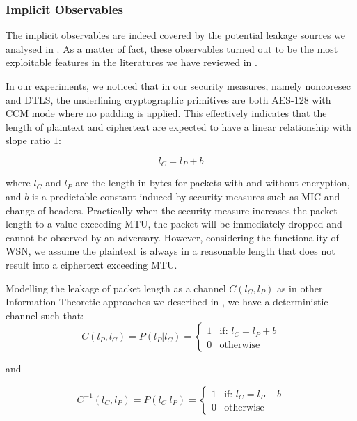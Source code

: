 \subsubsection{Implicit Observables}

The implicit observables are indeed covered by the potential leakage sources we analysed in . As a matter of fact, these observables turned out to be the most exploitable features in the literatures we have reviewed in .

In our experiments, we noticed that in our security measures, namely noncoresec and DTLS, the underlining cryptographic primitives are both AES-128 with CCM mode where no padding is applied. This effectively indicates that the length of plaintext and ciphertext are expected to have a linear relationship with slope ratio $1$:

\begin{equation} \label{Eq: Linear Length}
	l_{C} = l_{P} + b
\end{equation}

where $l_{C}$ and $l_{P}$ are the length in bytes for packets with and without encryption, and $b$ is a predictable constant induced by security measures such as MIC and change of headers. Practically when the security measure increases the packet length to a value exceeding MTU, the packet will be immediately dropped and cannot be observed by an adversary. However, considering the functionality of WSN, we assume the plaintext is always in a reasonable length that does not result into a ciphertext exceeding MTU.

Modelling the leakage of packet length as a channel $C(l_{C},l_{P})$ as in other Information Theoretic approaches we described in , we have a deterministic channel such that:
\begin{equation}
	C(l_{P}, l_{C}) = P(l_{P} | l_{C}) = 
	\begin{cases}
		1 &\text{if: } l_{C} = l_{P} + b \\
		0 &\text{otherwise}
	\end{cases}
\end{equation}

and

\begin{equation}
	C^{-1}(l_{C}, l_{P}) = P(l_{C} | l_{P}) = 
	\begin{cases}
		1 &\text{if: } l_{C} = l_{P} + b \\
		0 &\text{otherwise}
	\end{cases}
\end{equation}

